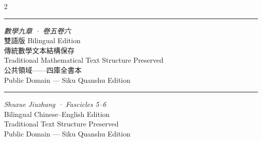 \documentclass[11pt,a4paper]{article}
\begin{document}
\vspace{1.5cm}
\begin{paracol}{2}
\begin{center}
{\color{rulecolor}\rule{0.5\columnwidth}{0.4pt}}

\vspace{1em}
{\small\color{sectioncolor}
\textit{數學九章 · 卷五卷六}\\[0.3em]
雙語版 \textbar{} Bilingual Edition\\[0.3em]
傳統數學文本結構保存\\
Traditional Mathematical Text Structure Preserved\\[0.3em]
公共領域——四庫全書本\\
Public Domain --- Siku Quanshu Edition}
\end{center}

\switchcolumn

\begin{center}
{\color{rulecolor}\rule{0.5\columnwidth}{0.4pt}}

\vspace{1em}
{\small\color{sectioncolor}
\textit{Shuxue Jiuzhang · Fascicles 5--6}\\[0.3em]
Bilingual Chinese--English Edition\\[0.3em]
Traditional Text Structure Preserved\\[0.3em]
Public Domain --- Siku Quanshu Edition}
\end{center}

\end{paracol}
\end{document}
